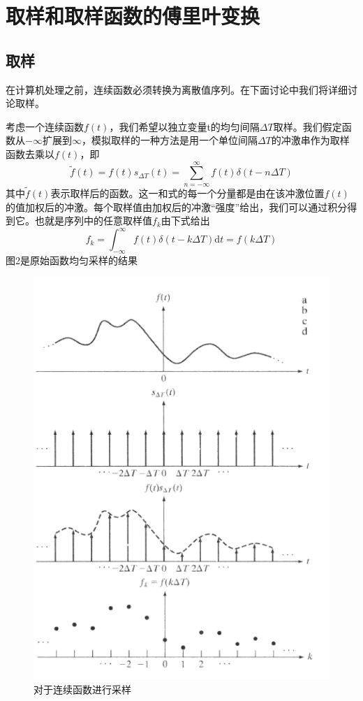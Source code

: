 \documentclass[UTF8,a4paper]{ctexart}
\begin{document}
\section{取样和取样函数的傅里叶变换}
\subsection{取样}
在计算机处理之前，连续函数必须转换为离散值序列。在下面讨论中我们将详细讨论取样。\par
考虑一个连续函数$f(t)$，我们希望以独立变量t的均匀间隔$\Delta T$取样。我们假定函数从$-\infty$扩展到$\infty$，模拟取样的一种方法是用一个单位间隔$\Delta T$的冲激串作为取样函数去乘以$f(t)$，即
\begin{equation}\tilde{f}(t)=f(t) s_{\Delta T}(t)=\sum_{n=-\infty}^{\infty} f(t) \delta(t-n \Delta T)\end{equation}
其中$\tilde{f}(t)$表示取样后的函数。这一和式的每一个分量都是由在该冲激位置$f(t)$的值加权后的冲激。每个取样值由加权后的冲激“强度”给出，我们可以通过积分得到它。也就是序列中的任意取样值$f_{k}$由下式给出
\begin{equation}
  f_{k}=\int_{-\infty}^{\infty}f(t)\delta(t-k\Delta T)\mathrm{d}t=f(k\Delta T)
\end{equation}
图2是原始函数均匀采样的结果
 \begin{figure}[ht]
	\centering
	\includegraphics[scale=0.6]{pic2.png}
	\caption{对于连续函数进行采样}
\end{figure}
\end{document}

